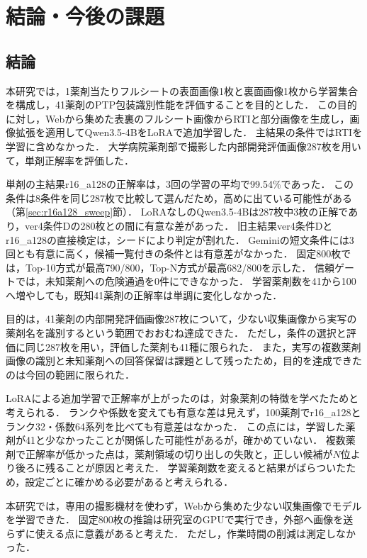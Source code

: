 \documentclass[uplatex,dvipdfmx]{jsarticle}
\begin{document}
\clearpage
\section{結論・今後の課題}\label{sec:conclusion}

\subsection{結論}

本研究では，1薬剤当たりフルシートの表面画像1枚と裏面画像1枚から学習集合を構成し，41薬剤のPTP包装識別性能を評価することを目的とした．
この目的に対し，Webから集めた表裏のフルシート画像からRTIと部分画像を生成し，画像拡張を適用してQwen3.5-4BをLoRAで追加学習した．
主結果の条件ではRTIを学習に含めなかった．
大学病院薬剤部で撮影した内部開発評価画像287枚を用いて，単剤正解率を評価した．

単剤の主結果r16\_a128の正解率は，3回の学習の平均で99.54\%であった．
この条件は8条件を同じ287枚で比較して選んだため，高めに出ている可能性がある（第\ref{sec:r16a128_sweep}節）．
LoRAなしのQwen3.5-4Bは287枚中3枚の正解であり，ver4条件Dの280枚との間に有意な差があった．
旧主結果ver4条件Dとr16\_a128の直接検定は，シードにより判定が割れた．
Geminiの短文条件には3回とも有意に高く，候補一覧付きの条件とは有意差がなかった．
固定800枚では，Top-10方式が最高790/800，Top-N方式が最高682/800を示した．
信頼ゲートでは，未知薬剤への危険通過を0件にできなかった．
学習薬剤数を41から100へ増やしても，既知41薬剤の正解率は単調に変化しなかった．

目的は，41薬剤の内部開発評価画像287枚について，少ない収集画像から実写の薬剤名を識別するという範囲でおおむね達成できた．
ただし，条件の選択と評価に同じ287枚を用い，評価した薬剤も41種に限られた．
また，実写の複数薬剤画像の識別と未知薬剤への回答保留は課題として残ったため，目的を達成できたのは今回の範囲に限られた．

LoRAによる追加学習で正解率が上がったのは，対象薬剤の特徴を学べたためと考えられる．
ランクや係数を変えても有意な差は見えず，100薬剤でr16\_a128とランク32・係数64系列を比べても有意差はなかった．
この点には，学習した薬剤が41と少なかったことが関係した可能性があるが，確かめていない．
複数薬剤で正解率が低かった点は，薬剤領域の切り出しの失敗と，正しい候補が$N$位より後ろに残ることが原因と考えた．
学習薬剤数を変えると結果がばらついたため，設定ごとに確かめる必要があると考えられる．

本研究では，専用の撮影機材を使わず，Webから集めた少ない収集画像でモデルを学習できた．
固定800枚の推論は研究室のGPUで実行でき，外部へ画像を送らずに使える点に意義があると考えた．
ただし，作業時間の削減は測定しなかった．
\end{document}

